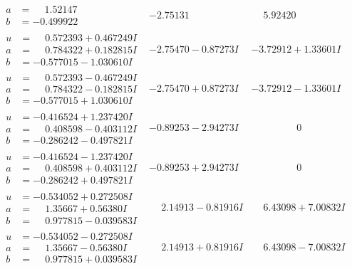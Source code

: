 \documentclass[1p]{elsarticle_modified}
\theoremstyle{definition}
\begin{document}
$$\begin{array}{c|c|c}
\begin{aligned}
a &= \phantom{-}1.52147\phantom{ +0.000000I} \\
b &= -0.499922\phantom{ +0.000000I}\end{aligned}
 & -2.75131\phantom{ +0.000000I} & \phantom{-}5.92420\phantom{ +0.000000I} \\ \hline\begin{aligned}
u &= \phantom{-}0.572393 + 0.467249 I \\
a &= \phantom{-}0.784322 + 0.182815 I \\
b &= -0.577015 - 1.030610 I\end{aligned}
 & -2.75470 - 0.87273 I & -3.72912 + 1.33601 I \\ \hline\begin{aligned}
u &= \phantom{-}0.572393 - 0.467249 I \\
a &= \phantom{-}0.784322 - 0.182815 I \\
b &= -0.577015 + 1.030610 I\end{aligned}
 & -2.75470 + 0.87273 I & -3.72912 - 1.33601 I \\ \hline\begin{aligned}
u &= -0.416524 + 1.237420 I \\
a &= \phantom{-}0.408598 - 0.403112 I \\
b &= -0.286242 - 0.497821 I\end{aligned}
 & -0.89253 - 2.94273 I & \phantom{-0.000000 } 0 \\ \hline\begin{aligned}
u &= -0.416524 - 1.237420 I \\
a &= \phantom{-}0.408598 + 0.403112 I \\
b &= -0.286242 + 0.497821 I\end{aligned}
 & -0.89253 + 2.94273 I & \phantom{-0.000000 } 0 \\ \hline\begin{aligned}
u &= -0.534052 + 0.272508 I \\
a &= \phantom{-}1.35667 + 0.56380 I \\
b &= \phantom{-}0.977815 - 0.039583 I\end{aligned}
 & \phantom{-}2.14913 - 0.81916 I & \phantom{-}6.43098 + 7.00832 I \\ \hline\begin{aligned}
u &= -0.534052 - 0.272508 I \\
a &= \phantom{-}1.35667 - 0.56380 I \\
b &= \phantom{-}0.977815 + 0.039583 I\end{aligned}
 & \phantom{-}2.14913 + 0.81916 I & \phantom{-}6.43098 - 7.00832 I \\ \hline\begin{aligned}

\end{aligned}
\end{array}$$
\end{document}
